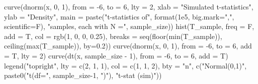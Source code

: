 \documentclass[
  11pt,
  a4paper,
]{book}
\newenvironment{Shaded}{\begin{snugshade}}{\end{snugshade}}
\newcommand{\AttributeTok}[1]{\textcolor[rgb]{0.77,0.63,0.00}{#1}}
\newcommand{\DecValTok}[1]{\textcolor[rgb]{0.00,0.00,0.81}{#1}}
\newcommand{\FloatTok}[1]{\textcolor[rgb]{0.00,0.00,0.81}{#1}}
\newcommand{\FunctionTok}[1]{\textcolor[rgb]{0.00,0.00,0.00}{#1}}
\newcommand{\NormalTok}[1]{#1}
\newcommand{\SpecialCharTok}[1]{\textcolor[rgb]{0.00,0.00,0.00}{#1}}
\newcommand{\StringTok}[1]{\textcolor[rgb]{0.31,0.60,0.02}{#1}}
\begin{document}
\begin{Shaded}
\begin{Highlighting}[]
\FunctionTok{curve}\NormalTok{(}\FunctionTok{dnorm}\NormalTok{(x, }\DecValTok{0}\NormalTok{, }\DecValTok{1}\NormalTok{), }\AttributeTok{from =} \SpecialCharTok{{-}}\DecValTok{6}\NormalTok{, }\AttributeTok{to =} \DecValTok{6}\NormalTok{, }\AttributeTok{lty =} \DecValTok{2}\NormalTok{, }
      \AttributeTok{xlab =} \StringTok{"Simulated t{-}statistics"}\NormalTok{, }\AttributeTok{ylab =} \StringTok{"Density"}\NormalTok{,}
      \AttributeTok{main =} \FunctionTok{paste}\NormalTok{(}\StringTok{"t{-}statistics of"}\NormalTok{, }\FunctionTok{format}\NormalTok{(}\FloatTok{1e5}\NormalTok{, }\AttributeTok{big.mark=}\StringTok{","}\NormalTok{, }\AttributeTok{scientific=}\NormalTok{F), }
                   \StringTok{"samples, each with N ="}\NormalTok{, sample\_size))}
\FunctionTok{hist}\NormalTok{(T\_sample, }\AttributeTok{freq =}\NormalTok{ F, }\AttributeTok{add =}\NormalTok{ T, }\AttributeTok{col =} \FunctionTok{rgb}\NormalTok{(}\DecValTok{1}\NormalTok{, }\DecValTok{0}\NormalTok{, }\DecValTok{0}\NormalTok{, }\FloatTok{0.25}\NormalTok{), }
     \AttributeTok{breaks =} \FunctionTok{seq}\NormalTok{(}\FunctionTok{floor}\NormalTok{(}\FunctionTok{min}\NormalTok{(T\_sample)), }\FunctionTok{ceiling}\NormalTok{(}\FunctionTok{max}\NormalTok{(T\_sample)), }\AttributeTok{by=}\FloatTok{0.2}\NormalTok{))}
\FunctionTok{curve}\NormalTok{(}\FunctionTok{dnorm}\NormalTok{(x, }\DecValTok{0}\NormalTok{, }\DecValTok{1}\NormalTok{), }\AttributeTok{from =} \SpecialCharTok{{-}}\DecValTok{6}\NormalTok{, }\AttributeTok{to =} \DecValTok{6}\NormalTok{, }\AttributeTok{add =}\NormalTok{ T, }\AttributeTok{lty =} \DecValTok{2}\NormalTok{)}
\FunctionTok{curve}\NormalTok{(}\FunctionTok{dt}\NormalTok{(x, sample\_size }\SpecialCharTok{{-}} \DecValTok{1}\NormalTok{), }\AttributeTok{from =} \SpecialCharTok{{-}}\DecValTok{6}\NormalTok{, }\AttributeTok{to =} \DecValTok{6}\NormalTok{, }\AttributeTok{add =}\NormalTok{ T)}
\FunctionTok{legend}\NormalTok{(}\StringTok{"topright"}\NormalTok{, }\AttributeTok{lty =} \FunctionTok{c}\NormalTok{(}\DecValTok{2}\NormalTok{, }\DecValTok{1}\NormalTok{, }\DecValTok{1}\NormalTok{), }\AttributeTok{col =} \FunctionTok{c}\NormalTok{(}\DecValTok{1}\NormalTok{, }\DecValTok{1}\NormalTok{, }\DecValTok{2}\NormalTok{), }\AttributeTok{bty =} \StringTok{"n"}\NormalTok{,}
       \FunctionTok{c}\NormalTok{(}\StringTok{"Normal(0,1)"}\NormalTok{, }\FunctionTok{paste0}\NormalTok{(}\StringTok{"t(df="}\NormalTok{, sample\_size}\DecValTok{{-}1}\NormalTok{, }\StringTok{")"}\NormalTok{), }\StringTok{"t{-}stat (sim)"}\NormalTok{))}
\end{Highlighting}
\end{Shaded}
\end{document}
